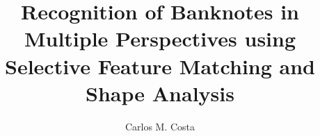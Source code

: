 









\mainmatter
\title{Recognition of Banknotes in Multiple Perspectives using Selective Feature Matching and Shape Analysis}

\author{Carlos M. Costa}


\maketitle










%









